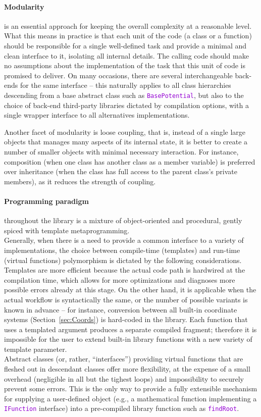 \documentclass[12pt]{article}
\newcommand{\ttt}[1]{\textcolor{darkviolet}{\texttt{#1}}}
\begin{document}
\paragraph{Modularity} is an essential approach for keeping the overall complexity at a reasonable level. What this means in practice is that each unit of the code (a class or a function) should be responsible for a single well-defined task and provide a minimal and clean interface to it, isolating all internal details. The calling code should make no assumptions about the implementation of the task that this unit of code is promised to deliver. On many occasions, there are several interchangeable back-ends for the same interface -- this naturally applies to all class hierarchies descending from a base abstract class such as \ttt{BasePotential}, but also to the choice of back-end third-party libraries dictated by compilation options, with a single wrapper interface to all alternatives implementations.

Another facet of modularity is loose coupling, that is, instead of a single large objects that manages many aspects of its internal state, it is better to create a number of smaller objects with minimal necessary interaction. For instance, composition (when one class has another class as a member variable) is preferred over inheritance (when the class has full access to the parent class's private members), as it reduces the strength of coupling.

\paragraph{Programming paradigm} throughout the library is a mixture of object-oriented and procedural, gently spiced with template metaprogramming.\\
Generally, when there is a need to provide a common interface to a variety of implementations, the choice between compile-time (templates) and run-time (virtual functions) polymorphism is dictated by the following considerations.\\
Templates are more efficient because the actual code path is hardwired at the compilation time, which allows for more optimizations and diagnoses more possible errors already at this stage. On the other hand, it is applicable when the actual workflow is syntactically the same, or the number of possible variants is known in advance -- for instance, conversion between all built-in coordinate systems (Section~\ref{sec:Coords}) is hard-coded in the library. Each function that uses a templated argument produces a separate compiled fragment; therefore it is impossible for the user to extend built-in library functions with a new variety of template parameter.\\
Abstract classes (or, rather, ``interfaces'') providing virtual functions that are fleshed out in descendant classes offer more flexibility, at the expense of a small overhead (negligible in all but the tighest loops) and impossibility to securely prevent some errors. This is the only way to provide a fully extensible mechanism for supplying a user-defined object (e.g., a mathematical function implementing a \ttt{IFunction} interface) into a pre-compiled library function such as \ttt{findRoot}.
\end{document}
